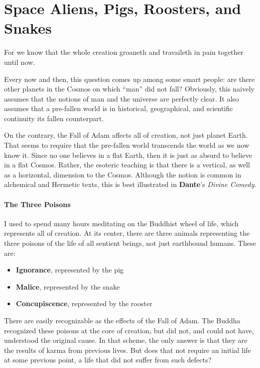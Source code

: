 \section{Space Aliens, Pigs, Roosters, and Snakes}

\begin{quotex}
For we know that the whole creation groaneth and travaileth in pain together until now.
\end{quotex}


Every now and then, this question comes up among some smart people: are there other planets in the Cosmos on which ``man'' did not fall? Obviously, this naively assumes that the notions of man and the universe are perfectly clear. It also assumes that a pre-fallen world is in historical, geographical, and scientific continuity its fallen counterpart.

On the contrary, the Fall of Adam affects all of creation, not just planet Earth. That seems to require that the pre-fallen world transcends the world as we now know it. Since no one believes in a flat Earth, then it is just as absurd to believe in a flat Cosmos. Rather, the esoteric teaching is that there is a vertical, as well as a horizontal, dimension to the Cosmos. Although the notion is common in alchemical and Hermetic texts, this is best illustrated in \textbf{Dante}'s \emph{Divine Comedy}.

\paragraph{The Three Poisons}

I used to spend many hours meditating on the Buddhist wheel of life, which represents all of creation. At its center, there are three animals representing the three poisons of the life of all sentient beings, not just earthbound humans. These are:

\begin{itemize}


\item \textbf{Ignorance}, represented by the pig


\item \textbf{Malice}, represented by the snake


\item \textbf{Concupiscence}, represented by the rooster

\end{itemize}


There are easily recognizable as the effects of the Fall of Adam. The Buddha recognized these poisons at the core of creation, but did not, and could not have, understood the original cause. In that scheme, the only answer is that they are the results of karma from previous lives. But does that not require an initial life at some previous point, a life that did not suffer from such defects?

